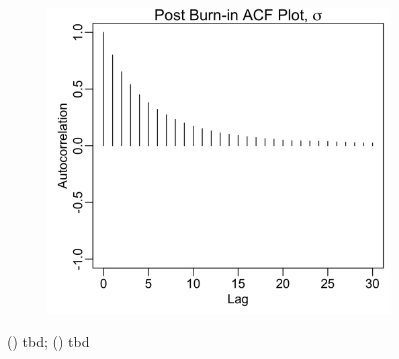 \documentclass{uwstat572}
\begin{document}
\begin{figure}[H]
\begin{subfigure}[b]{0.49\textwidth}
		\includegraphics[width=\textwidth]{figures/mcmc_acf_plot_sigma.png}
		\caption{}
		\label{fig:acf_sigma}
	\end{subfigure}
	\caption{() tbd; () tbd }
	\label{fig:data_plot}
\end{figure} 
\end{document}
